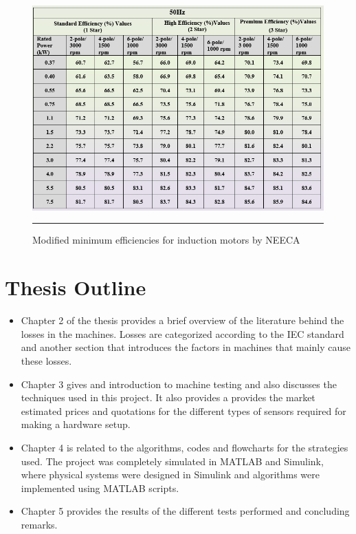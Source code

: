 \begin{figure}[htbp]
  \centering
    \includegraphics[width = 5in]{./Figures/MS/fig15.png}
    \rule{35em}{1.2pt}
  \caption{Modified minimum efficiencies for induction motors by NEECA}
  \label{fig:Modified minimum efficiencies for induction motors by NEECA}
\end{figure}

\section{Thesis Outline}
\begin{itemize}
  \item Chapter 2 of the thesis provides a brief overview of the literature behind the losses in the machines. Losses are categorized according to the IEC standard and another section that introduces the factors in machines that mainly cause these losses.
  \item Chapter 3 gives and introduction to machine testing and also discusses the techniques used in this project. It also provides a provides the market estimated prices and quotations for the different types of sensors required for making a hardware setup.
  \item Chapter 4 is related to the algorithms, codes and flowcharts for the strategies used. The project was completely simulated in MATLAB and Simulink, where physical systems were designed in Simulink and algorithms were implemented using MATLAB scripts.
  \item Chapter 5 provides the results of the different tests performed and concluding remarks.
\end{itemize}
